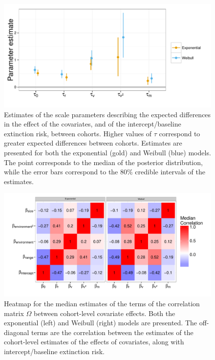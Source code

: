 \documentclass[12pt,letterpaper]{article}
\begin{document}
\begin{figure}[ht]
  \centering
  \includegraphics[height = 0.5\textheight,width=\textwidth,keepaspectratio=true]{figure/coef_var}
  \caption{Estimates of the scale parameters describing the expected differences in the effect of the covariates, and of the intercept/baseline extinction risk, between cohorts. Higher values of \(\tau\) correspond to greater expected differences between cohorts. Estimates are presented for both the exponential (gold) and Weibull (blue) models. The point corresponds to the median of the posterior distribution, while the error bars correspond to the 80\% credible intervals of the estimates.}
  \label{fig:tau}
\end{figure}

\begin{figure}[ht]
  \centering
  \includegraphics[height = 0.5\textheight,width=\textwidth,keepaspectratio=true]{figure/correlation_heatmap}
  \caption{Heatmap for the median estimates of the terms of the correlation matrix \(\Omega\) between cohort-level covariate effects. Both the exponential (left) and Weibull (right) models are presented. The off-diagonal terms are the correlation between the estimates of the cohort-level estimates of the effects of covariates, along with intercept/baseline extinction risk.}
  \label{fig:omega}
\end{figure}
\end{document}
